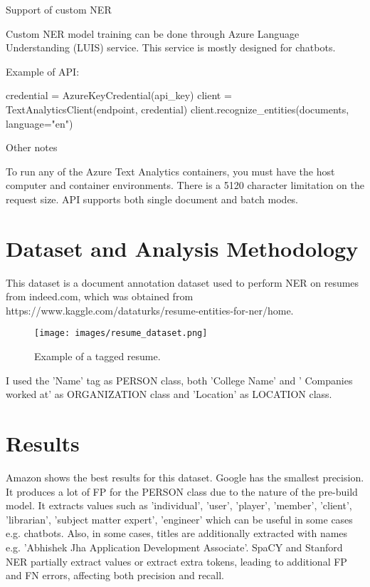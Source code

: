 \documentclass[conference]{IEEEtran}
\begin{document}
Support of custom NER

Custom NER model training can be done through Azure Language Understanding (LUIS) service. This service is mostly designed for chatbots.

Example of API:

\begin{verbatimtab}[4]
credential = AzureKeyCredential(api_key)
client = TextAnalyticsClient(endpoint, 
	credential)
client.recognize_entities(documents,
	 language="en")
\end{verbatimtab}

Other notes

To run any of the Azure Text Analytics containers, you must have the host computer and container environments. There is a 5120 character limitation on the request size. API supports both single document and batch modes.

\section{Dataset and Analysis Methodology}

This dataset is a document annotation dataset used to perform NER on resumes from indeed.com, which was obtained from https://www.kaggle.com/dataturks/resume-entities-for-ner/home.

\begin{figure}[htbp]
\centerline{\texttt{[image: images/resume\_dataset.png]}}
\caption{Example of a tagged resume.}
\label{fig1}
\end{figure}

I used the 'Name' tag as PERSON class, both 'College Name' and ' Companies worked at' as ORGANIZATION class and 'Location' as LOCATION class.


\section{Results}

Amazon shows the best results for this dataset. Google has the smallest precision. It produces a lot of FP for the PERSON class due to the nature of the pre-build model.  It extracts values such as 'individual', 'user', 'player', 'member', 'client', 'librarian', 'subject matter expert', 'engineer' which can be useful in some cases e.g. chatbots. Also, in some cases, titles are additionally extracted with names e.g. 'Abhishek Jha Application Development Associate'. SpaCY and Stanford NER partially extract values or extract extra tokens, leading to additional FP and FN errors, affecting both precision and recall.
\end{document}
